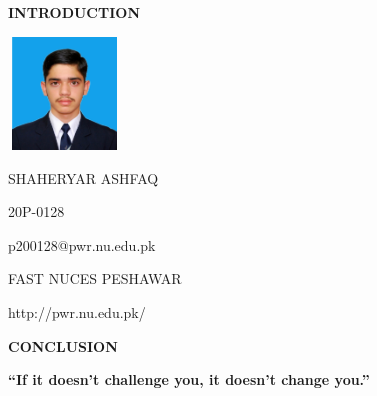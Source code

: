 \documentclass{letter}
\begin{document}
	\begin{center}
	\huge{\bfseries INTRODUCTION}
	\end{center}	

\bigskip
\bigskip
\bigskip
\bigskip

\begin{flushright}

\includegraphics[height=3cm, width=3cm]{shaheryar.jpg}

\vspace{-4cm}

\end{flushright}


	\begin{flushleft}


\large 
	SHAHERYAR ASHFAQ
	\smallskip


20P-0128
\smallskip

p200128@pwr.nu.edu.pk
\smallskip

FAST NUCES PESHAWAR
\smallskip

http://pwr.nu.edu.pk/

   \end{flushleft}

\bigskip

	\begin{center}

	\huge{\bfseries CONCLUSION}
	\end{center}
\bigskip

\bfseries{“If it doesn’t challenge you, it doesn’t change you.”}
\end{document}
